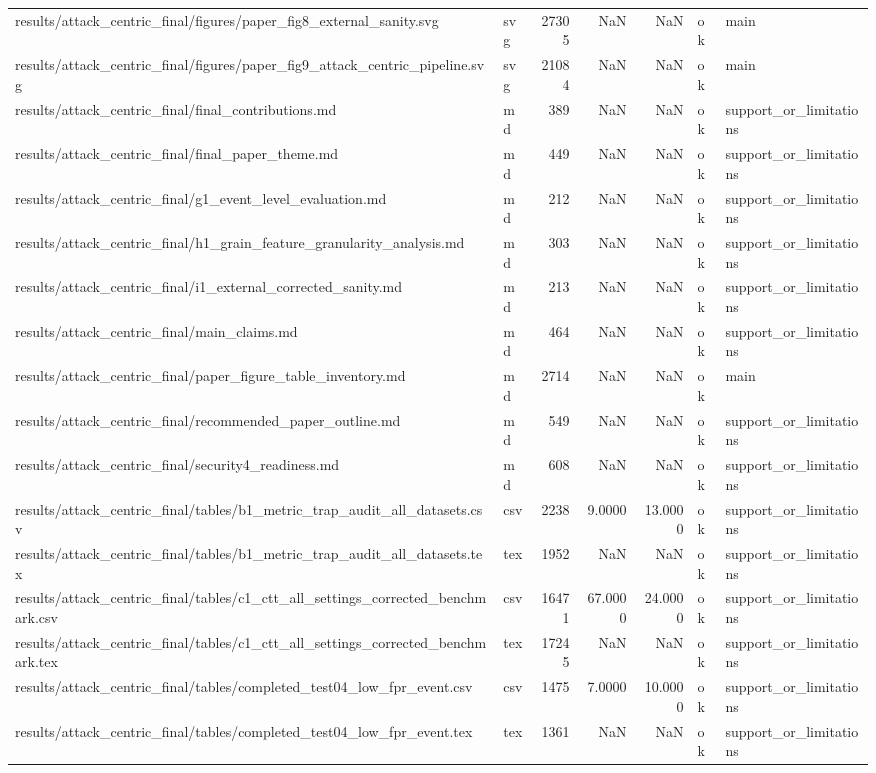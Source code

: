 \begin{tabular}{llrrrll}
results/attack_centric_final/figures/paper_fig8_external_sanity.svg & svg & 27305 & NaN & NaN & ok & main \\
results/attack_centric_final/figures/paper_fig9_attack_centric_pipeline.svg & svg & 21084 & NaN & NaN & ok & main \\
results/attack_centric_final/final_contributions.md & md & 389 & NaN & NaN & ok & support_or_limitations \\
results/attack_centric_final/final_paper_theme.md & md & 449 & NaN & NaN & ok & support_or_limitations \\
results/attack_centric_final/g1_event_level_evaluation.md & md & 212 & NaN & NaN & ok & support_or_limitations \\
results/attack_centric_final/h1_grain_feature_granularity_analysis.md & md & 303 & NaN & NaN & ok & support_or_limitations \\
results/attack_centric_final/i1_external_corrected_sanity.md & md & 213 & NaN & NaN & ok & support_or_limitations \\
results/attack_centric_final/main_claims.md & md & 464 & NaN & NaN & ok & support_or_limitations \\
results/attack_centric_final/paper_figure_table_inventory.md & md & 2714 & NaN & NaN & ok & main \\
results/attack_centric_final/recommended_paper_outline.md & md & 549 & NaN & NaN & ok & support_or_limitations \\
results/attack_centric_final/security4_readiness.md & md & 608 & NaN & NaN & ok & support_or_limitations \\
results/attack_centric_final/tables/b1_metric_trap_audit_all_datasets.csv & csv & 2238 & 9.0000 & 13.0000 & ok & support_or_limitations \\
results/attack_centric_final/tables/b1_metric_trap_audit_all_datasets.tex & tex & 1952 & NaN & NaN & ok & support_or_limitations \\
results/attack_centric_final/tables/c1_ctt_all_settings_corrected_benchmark.csv & csv & 16471 & 67.0000 & 24.0000 & ok & support_or_limitations \\
results/attack_centric_final/tables/c1_ctt_all_settings_corrected_benchmark.tex & tex & 17245 & NaN & NaN & ok & support_or_limitations \\
results/attack_centric_final/tables/completed_test04_low_fpr_event.csv & csv & 1475 & 7.0000 & 10.0000 & ok & support_or_limitations \\
results/attack_centric_final/tables/completed_test04_low_fpr_event.tex & tex & 1361 & NaN & NaN & ok & support_or_limitations \\

\end{tabular}
